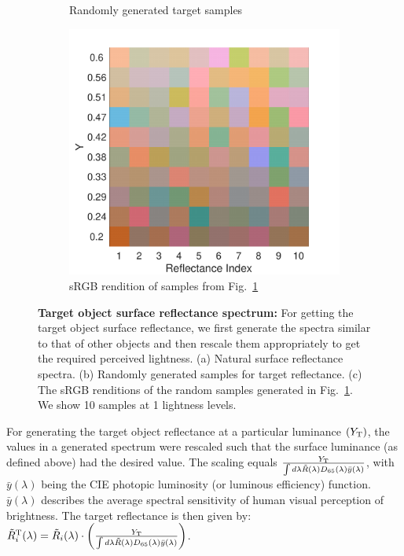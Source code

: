 \documentclass{jov}
\begin{document}
\begin{figure}
\begin{subfigure}[b]{0.3\textwidth}
        \caption{Randomly generated target samples}
        \label{fig:randomSurfaceTarget}
    \end{subfigure}
    \begin{subfigure}[b]{0.3 \textwidth}
    \centering
        \includegraphics[width=\textwidth]{../Figures/Figure8/Figure8_c.pdf}
        \caption{sRGB rendition of samples from Fig.~\ref{fig:randomSurfaceTarget}}
        \label{fig:sRGBSurfaceTarget}
    \end{subfigure}
    \caption{{\bf Target object surface reflectance spectrum:} For getting the target object surface reflectance, we first generate the spectra similar to that of other objects and then rescale them appropriately to get the required perceived lightness. (a) Natural surface reflectance spectra. (b) Randomly generated samples for target reflectance. (c) The sRGB renditions of the random samples generated in Fig.~\ref{fig:randomSurfaceTarget}. We show 10 samples at 1 lightness levels.}\label{fig:targetSurfaceReflectance}
\end{figure}

For generating the target object reflectance at a particular luminance $(Y_{\rm T})$, the values in a generated spectrum were 
rescaled such that the surface luminance (as defined above) had the desired value.
The scaling equals $\frac{Y_{\rm T}}{\int d\lambda \tilde{R}(\lambda) D_{65}(\lambda) \bar{y}(\lambda)}$, with $\bar{y}(\lambda)$ being the CIE photopic luminosity (or luminous efficiency) function. 
$\bar{y}(\lambda)$ describes the average spectral sensitivity of human visual 
perception of brightness. The target reflectance is then given by: $\tilde{R}^{\rm T}_i(\lambda) =\tilde{R}_i(\lambda) \cdot\left(\frac{Y_{\rm T}}{\int d\lambda \tilde{R}(\lambda) D_{65}(\lambda) \bar{y}(\lambda)}\right)$.
\end{document}
